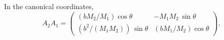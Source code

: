 \documentclass[a4paper,11pt]{article}
\theoremstyle{definition}
\begin{document}

In the canonical coordinates,
\begin{equation}\label{A2A1}
    A_2 A_1 = \begin{pmatrix} (bM_2/M_1)\cos\theta & -M_1 M_2\,\sin\theta \\[4pt] (b^2/(M_1 M_2))\,\sin\theta & (bM_1/M_2)\cos\theta \end{pmatrix},
    \end{equation}
\end{document}
